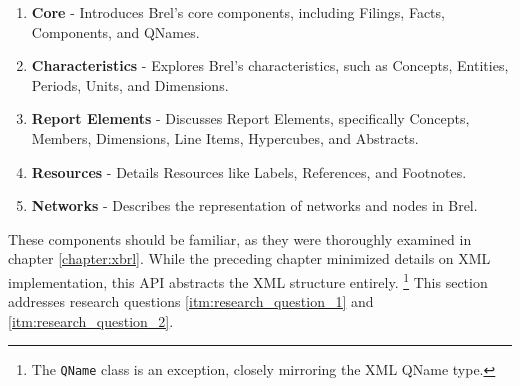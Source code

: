 \begin{enumerate}
    \item \textbf{Core} - Introduces Brel's core components, including Filings, Facts, Components, and QNames.
    \item \textbf{Characteristics} - Explores Brel's characteristics, such as Concepts, Entities, Periods, Units, and Dimensions.
    \item \textbf{Report Elements} - Discusses Report Elements, specifically Concepts, Members, Dimensions, Line Items, Hypercubes, and Abstracts.
    \item \textbf{Resources} - Details Resources like Labels, References, and Footnotes.
    \item \textbf{Networks} - Describes the representation of networks and nodes in Brel.
\end{enumerate}

These components should be familiar, as they were thoroughly examined in chapter \ref{chapter:xbrl}. 
While the preceding chapter minimized details on XML implementation, this API abstracts the XML structure entirely.
\footnote{The \texttt{QName} class is an exception, closely mirroring the XML QName type.}
This section addresses research questions \ref{itm:research_question_1} and \ref{itm:research_question_2}.

